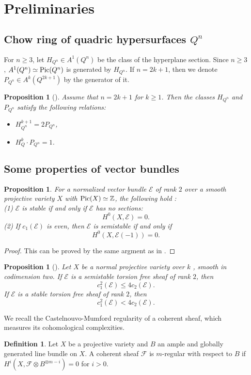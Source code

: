 \documentclass{amsproc}
\newtheorem{proposition}[theorem]{Proposition}
\theoremstyle{definition}
\newtheorem{definition}[theorem]{Definition}
\def\Z{{\mathbb Z}}
\def\cE{{\mathcal E}}
\def\cF{{\mathcal F}}
\def\tensor{\otimes}
\begin{document}
\section{Preliminaries}
\subsection{Chow ring of quadric hypersurfaces $Q^n$}

For $n\ge 3$, let $H_{Q^n} \in A^1(Q^n)$ be the class of the hyperplane section. Since $n\ge 3$, $A^1(Q^n)\simeq {\rm Pic}(Q^n)$ is generated by $H_{Q^n}$. If $n=2k+1$, then we denote $P_{Q^n}\in A^k(Q^{2k+1})$ by the generator of it.

\begin{proposition}[{\cite[Section~1]{F83}}]\label{prop:chow}
Assume that $n=2k+1$ for $k\ge 1$. Then the classes $H_{Q^n}$ and $P_{Q^n}$ satisfy the following relations:
\begin{itemize}
\item[(i)]$H_{Q^n}^{k+1}=2P_{Q^n}$,
\item[(ii)]$H^k_{Q}\cdot P_{Q^n}=1$.
\end{itemize}
\end{proposition}

\subsection{Some properties of vector  bundles}

\begin{proposition}\label{prop:normsta}
For a normalized vector bundle $\cE$ of rank $2$ over a smooth projective variety $X$ with ${\rm Pic}(X)\simeq \Z$, the following hold : \\
(1) $\cE$ is stable if and only if $\cE$ has no sections:
$$
H^0(X, \cE)=0.
$$
(2) If $c_1(\cE)$ is even, then $\cE$ is semistable if and only if 
$$
H^0(X,\cE(-1))=0.
$$
\end{proposition}

\begin{proof}
This can be proved by the same argment as in \cite[Lemma~1.2.5]{OSS80}.
\end{proof}

\begin{proposition}[{\cite[Corollary~3.5]{MP97}}]\label{prop:bogo}
Let $X$ be a normal projective variety over $k$ 
 , smooth in codimension two. If $\cE$ is a semistable  torsion free sheaf of rank $2$, then
$$
c_1^2(\cE)\le 4c_2(\cE).
$$
If $\cE$ is a stable  torsion free sheaf of rank $2$, then
$$
c_1^2(\cE)< 4c_2(\cE).
$$
\end{proposition}
We recall the Castelnouvo-Mumford regularity of a coherent sheaf, which measures its cohomological complexities. 
\begin{definition}\label{def:mreg}
Let $X$ be a projective variety and $B$ an ample and globally generated line bundle on $X$. A coherent sheaf $\cF$ is $m$-regular with respect to $B$ if $H^i(X, \cF\tensor B^{\tensor m-i})=0$ for $i>0$.
\end{definition}
\end{document}
